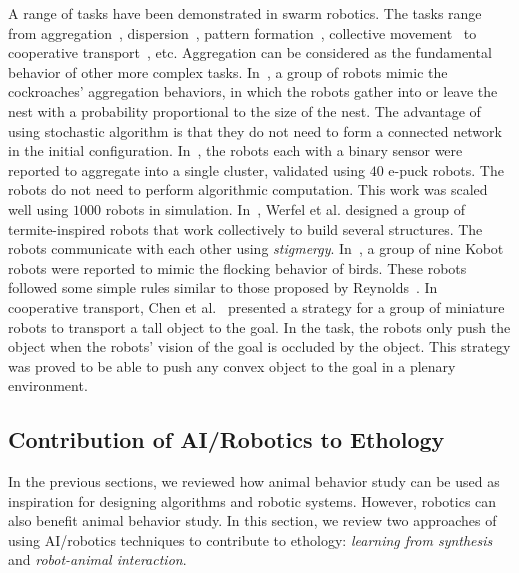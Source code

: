A range of tasks have been demonstrated in swarm robotics. The tasks range from aggregation~\cite{Trianni:LNCS:2003, Gauci2014_ijrr, Garnier:AL:2008, Jeanson:AB:2005}, dispersion~\cite{howard2002mobile, mclurkin2004distributed}, pattern formation~\cite{Fujibayashi:DARS:2002, Chen:AAMAS:2012}, collective movement~\cite{Turgut:SI:2008} to cooperative transport~\cite{Kube:AB:1993, Kube:RAS:2000,Gross:IJBC:2009, Jianing:TRO:2015}, etc. Aggregation can be considered as the fundamental behavior of other more complex tasks. In~\cite{Jeanson:AB:2005}, a group of robots mimic the cockroaches' aggregation behaviors, in which the robots gather into or leave the nest with a probability proportional to the size of the nest. The advantage of using stochastic algorithm is that they do not need to form a connected network in the initial configuration. In~\cite{Gauci2014_ijrr}, the robots each with a binary sensor were reported to aggregate into a single cluster, validated using $40$ e-puck robots. The robots do not need to perform algorithmic computation. This work was scaled well using $1000$ robots in simulation. In~\cite{Werfel:Sci:2014}, Werfel et al. designed a group of termite-inspired robots that work collectively to build several structures. The robots communicate with each other using \textit{stigmergy}. In~\cite{Turgut:SI:2008}, a group of nine Kobot robots were reported to mimic the flocking behavior of birds. These robots followed some simple rules similar to those proposed by Reynolds~\cite{Craig:CG:1987}. In cooperative transport, Chen et al.~\cite{Jianing:TRO:2015} presented a strategy for a group of miniature robots to transport a tall object to the goal. In the task, the robots only push the object when the robots' vision of the goal is occluded by the object. This strategy was proved to be able to push any convex object to the goal in a plenary environment. 

\subsection{Contribution of AI/Robotics to Ethology}\label{sec:contribution_of_AI/robotics_to_ethology}

In the previous sections, we reviewed how animal behavior study can be used as inspiration for designing algorithms and robotic systems. However, robotics can also benefit animal behavior study. In this section, we review two approaches of using AI/robotics techniques to contribute to ethology: \textit{learning from synthesis} and \textit{robot-animal interaction}.

